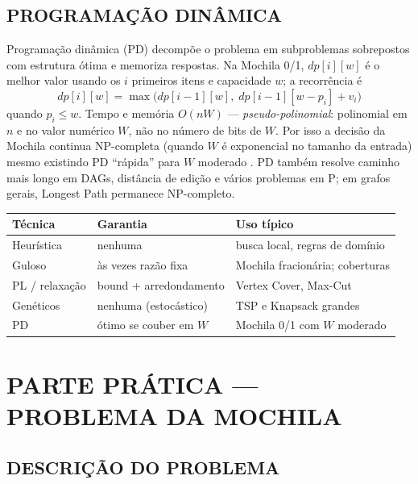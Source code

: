 \documentclass[
    12pt,
    oneside,
    a4paper,
    chapter=TITLE,
    section=TITLE,
    sumario=abnt-6027-2012
]{abntex2}
\begin{document}
\section{PROGRAMAÇÃO DINÂMICA}
\label{sec:pd}

Programação dinâmica (PD) decompõe o problema em subproblemas sobrepostos com estrutura ótima e memoriza respostas. Na Mochila 0/1, $dp[i][w]$ é o melhor valor usando os $i$ primeiros itens e capacidade $w$; a recorrência é
\[
dp[i][w] = \max\bigl(dp[i-1][w],\; dp[i-1][w-p_i] + v_i\bigr)
\]
quando $p_i \leq w$. Tempo e memória $O(nW)$ --- \textit{pseudo-polinomial}: polinomial em $n$ e no valor numérico $W$, não no número de bits de $W$. Por isso a decisão da Mochila continua NP-completa (quando $W$ é exponencial no tamanho da entrada) mesmo existindo PD ``rápida'' para $W$ moderado \cite{garey,cormen}. PD também resolve caminho mais longo em DAGs, distância de edição e vários problemas em P; em grafos gerais, Longest Path permanece NP-completo.

\begin{quadro}[!h]
    \centering
    \small
    \begin{tabular}{|p{2.8cm}|p{4.0cm}|p{5.4cm}|}
        \hline
        \textbf{Técnica} & \textbf{Garantia} & \textbf{Uso típico} \\
        \hline
        Heurística & nenhuma & busca local, regras de domínio \\
        \hline
        Guloso & às vezes razão fixa & Mochila fracionária; coberturas \\
        \hline
        PL / relaxação & bound + arredondamento & Vertex Cover, Max-Cut \\
        \hline
        Genéticos & nenhuma (estocástico) & TSP e Knapsack grandes \\
        \hline
        PD & ótimo se couber em $W$ & Mochila 0/1 com $W$ moderado \\
        \hline
    \end{tabular}
\end{quadro}

\chapter{PARTE PRÁTICA --- PROBLEMA DA MOCHILA}
\label{cap:pratica}

\section{DESCRIÇÃO DO PROBLEMA}
\label{sec:desc}
\end{document}
